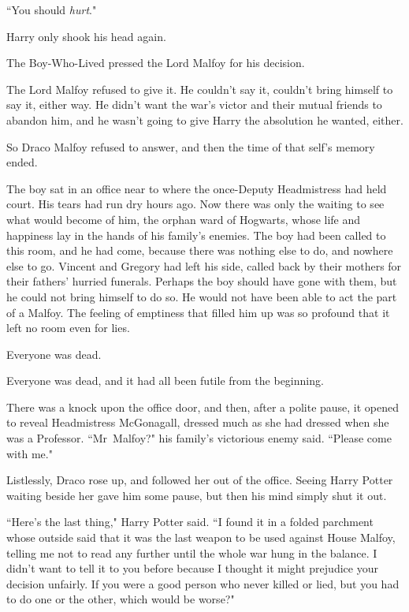 ``You should \emph{hurt}."

Harry only shook his head again.

The Boy-Who-Lived pressed the Lord Malfoy for his decision.

The Lord Malfoy refused to give it. He couldn't say it, couldn't bring himself to say it, either way. He didn't want the war's victor and their mutual friends to abandon him, and he wasn't going to give Harry the absolution he wanted, either.

So Draco Malfoy refused to answer, and then the time of that self's memory ended.

\later

The boy sat in an office near to where the once-Deputy Headmistress had held court. His tears had run dry hours ago. Now there was only the waiting to see what would become of him, the orphan ward of Hogwarts, whose life and happiness lay in the hands of his family's enemies. The boy had been called to this room, and he had come, because there was nothing else to do, and nowhere else to go. Vincent and Gregory had left his side, called back by their mothers for their fathers' hurried funerals. Perhaps the boy should have gone with them, but he could not bring himself to do so. He would not have been able to act the part of a Malfoy. The feeling of emptiness that filled him up was so profound that it left no room even for lies.

Everyone was dead.

Everyone was dead, and it had all been futile from the beginning.

There was a knock upon the office door, and then, after a polite pause, it opened to reveal Headmistress McGonagall, dressed much as she had dressed when she was a Professor. ``Mr~Malfoy?" his family's victorious enemy said. ``Please come with me."

Listlessly, Draco rose up, and followed her out of the office. Seeing Harry Potter waiting beside her gave him some pause, but then his mind simply shut it out.

``Here's the last thing," Harry Potter said. ``I found it in a folded parchment whose outside said that it was the last weapon to be used against House Malfoy, telling me not to read any further until the whole war hung in the balance. I didn't want to tell it to you before because I thought it might prejudice your decision unfairly. If you were a good person who never killed or lied, but you had to do one or the other, which would be worse?"

